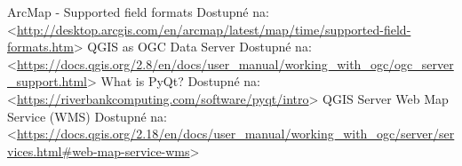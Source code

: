 \documentclass[12pt,a4paper]{article}
\begin{document}
\begin{thebibliography}{99}
ArcMap - Supported field formats \textit{}
Dostupné na: \textless\url{http://desktop.arcgis.com/en/arcmap/latest/map/time/supported-field-formats.htm}\textgreater
{}
QGIS as OGC Data Server\textit{}
Dostupné na: \textless\url{https://docs.qgis.org/2.8/en/docs/user_manual/working_with_ogc/ogc_server_support.html}\textgreater
{}
What is PyQt?\textit{}
Dostupné na: \textless\url{https://riverbankcomputing.com/software/pyqt/intro}\textgreater
{}
QGIS Server Web Map Service (WMS)\textit{}
Dostupné na: \textless\url{https://docs.qgis.org/2.18/en/docs/user_manual/working_with_ogc/server/services.html#web-map-service-wms}\textgreater
\end{thebibliography}
\end{document}
